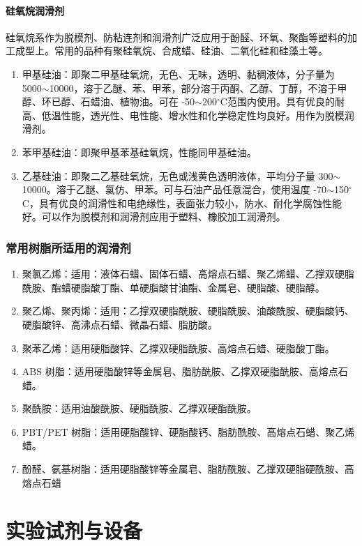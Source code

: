 \documentclass[a4paper, oneside, onecolumn, 12pt]{ctexrep}    %
\newcommand{\cd}{$^{\circ}$C}  %
\begin{document}
\subsubsection{硅氧烷润滑剂}
硅氧烷系作为脱模剂、防粘连剂和润滑剂广泛应用于酚醛、环氧、聚酯等塑料的加工成型上。常用的品种有聚硅氧烷、合成蜡、硅油、二氧化硅和硅藻土等。

\begin{enumerate}
    \item[\ding{192}] 甲基硅油：即聚二甲基硅氧烷，无色、无味，透明、黏稠液体，分子量为 5000$\sim$10000，溶于乙醚、苯、甲苯，部分溶于丙酮、乙醇、丁醇，不溶于甲醇、环已醇、石蜡油、植物油。可在 -50$\sim$200\cd 范围内使用。具有优良的耐高、低温性能，透光性、电性能、增水性和化学稳定性均良好。用作为脱模润滑剂。
    \item[\ding{193}] 苯甲基硅油：即聚甲基苯基硅氧烷，性能同甲基硅油。
    \item[\ding{194}] 乙基硅油：即聚二乙基硅氧烷，无色或浅黄色透明液体，平均分子量 300$\sim$10000。溶于乙醚、氯仿、甲苯。可与石油产品任意混合，使用温度 -70$\sim$150\cd，具有优良的润滑性和电绝缘性，表面张力较小，防水、耐化学腐蚀性能好。可以作为脱模剂和润滑剂应用于塑料、橡胶加工润滑剂。
\end{enumerate}

\subsection{常用树脂所适用的润滑剂}
\begin{enumerate}[(1) ]
    \item 聚氯乙烯：适用：液体石蜡、固体石蜡、高熔点石蜡、聚乙烯蜡、乙撑双硬脂酰胺、酯蜡硬脂酸丁酯、单硬脂酸甘油酯、金属皂、硬脂酸、硬脂醇。
    \item 聚乙烯、聚丙烯：适用：乙撑双硬脂酰胺、硬脂酰胺、油酸酰胺、硬脂酸钙、硬脂酸锌、高沸点石蜡、微晶石蜡、脂肪酸。
    \item 聚苯乙烯：适用硬脂酸锌、乙撑双硬脂酰胺、高熔点石蜡、硬脂酸丁酯。
    \item ABS 树脂：适用硬脂酸锌等金属皂、脂肪酰胺、乙撑双硬脂酰胺、高熔点石蜡。
    \item 聚酰胺：适用油酸酰胺、硬脂酰胺、乙撑双硬酯酰胺。
    \item PBT/PET 树脂：适用硬脂酸锌、硬脂酸钙、脂肪酰胺、高熔点石蜡、聚乙烯蜡。
    \item 酚醛、氨基树脂：适用硬脂酸锌等金属皂、脂肪酰胺、乙撑双硬脂硬酰胺、高熔点石蜡
\end{enumerate}


\chapter{实验试剂与设备}
\end{document}
